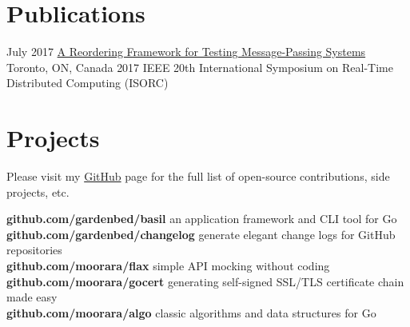 \documentclass[]{cv-style}                     %
\begin{document}

\section{Publications}

\begin{entrylist}

  \entry
  {\small July 2017}
  {\href{http://ieeexplore.ieee.org/abstract/document/7964877}{A Reordering Framework for Testing Message-Passing Systems}}
  {Toronto, ON, Canada}
  {\small{2017 IEEE 20th International Symposium on Real-Time Distributed Computing (ISORC)}}

\end{entrylist}



\section{Projects}

Please visit my \href{http://github.com/moorara}{GitHub} page for the full list of open-source contributions, side projects, etc.

\textbf{github.com/gardenbed/basil} an application framework and CLI tool for Go  \\
\textbf{github.com/gardenbed/changelog} generate elegant change logs for GitHub repositories  \\
\textbf{github.com/moorara/flax} simple API mocking without coding \\
\textbf{github.com/moorara/gocert} generating self-signed SSL/TLS certificate chain made easy \\
\textbf{github.com/moorara/algo} classic algorithms and data structures for Go \\

\begin{entrylist}



\end{entrylist}
\end{document}

